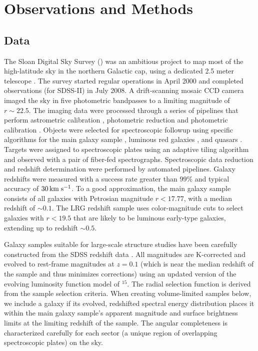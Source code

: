 \documentclass[]{emulateapj}
\newcommand{\kms}{\,{\rm km}\;{\rm s}^{-1}}
\begin{document}
\section{Observations and Methods}
\label{sec:obs}

\subsection{Data}
\label{subsec:data}

The Sloan Digital Sky Survey (\citealt{york00,stoughton02}) was an ambitious 
project to map most of the high-latitude sky in the northern Galactic cap, 
using a dedicated 2.5 meter telescope \citep{gunn06}. The survey started 
regular operations in April 2000 and completed observations (for SDSS-II)
in July 2008. A 
drift-scanning mosaic CCD camera \citep{gunn98} imaged the sky in five 
photometric bandpasses \citep{fukugita96,smith02} to a limiting magnitude of 
$r \sim 22.5$.  The imaging data were processed through a series of 
pipelines that perform astrometric calibration \citep{pier03}, photometric
reduction \citep{lupton99,lupton01} and photometric 
calibration \citep{hogg01,ivezic04,tucker06,padmanabhan08}.
Objects were selected for spectroscopic followup using specific algorithms 
for the main galaxy sample \citep{strauss02}, luminous red galaxies 
\citep{eisenstein01}, and quasars \citep{richards02}. 
Targets were assigned to spectroscopic plates using an adaptive 
tiling algorithm \citep{blanton03a} and observed with a pair of fiber-fed
spectrographs. Spectroscopic data reduction and redshift determination were
performed by automated pipelines. Galaxy redshifts were measured with a 
success rate greater than $99\%$ and typical accuracy of $30\kms$.  
To a good approximation, 
the main galaxy sample consists of all galaxies with Petrosian magnitude 
$r<17.77$, with a median redshift of $\sim0.1$.  The LRG redshift sample 
uses color-magnitude cuts to select galaxies with $r<19.5$ that are likely 
to be luminous early-type galaxies, extending up to redshift $\sim 0.5$.
%

Galaxy samples suitable for large-scale structure studies have been
carefully constructed from the SDSS redshift data \citep{blanton05b}. 
All magnitudes are K-corrected \citep{blanton03b} and evolved to 
rest-frame magnitudes at $z=0.1$ (which is near the median redshift of the 
sample and thus minimizes corrections)
using an updated version of the evolving
luminosity function model of \citet{blanton03c}$^{15}$. 
The radial selection
function is derived from the sample selection criteria.
When creating volume-limited samples below, we include a galaxy
if its evolved, redshifted spectral energy distribution places
it within the main galaxy sample's apparent magnitude and surface
brightness limits at the limiting redshift of the sample.
The angular completeness is characterized carefully for each sector
(a unique region of overlapping spectroscopic plates) on the sky. 
\end{document}
